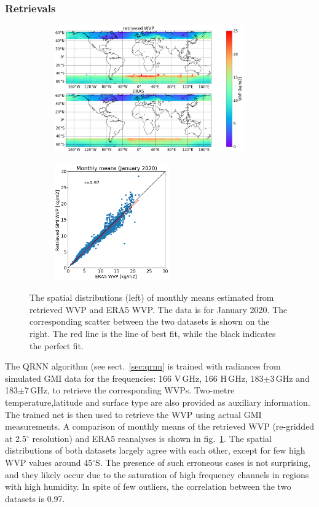 \documentclass[12pt,oneside,a4paper]{article}
\begin{document}
\subsubsection{Retrievals}
\label{sec:preliminary_results}
\begin{figure}[t]
	\centering
	\begin{subfigure}{.54\textwidth}
		\includegraphics[height = 55mm]{Figures/WVP_spatial_jan2020.png}
	\end{subfigure}
	\begin{subfigure}{.34\textwidth}
	\includegraphics[height = 50mm]{Figures/WVP_scatter_monthlymean.png} 
	\end{subfigure}
	\caption{The spatial distributions (left) of monthly means estimated from retrieved WVP and ERA5 WVP. The data is for January 2020. The corresponding scatter between the two datasets is shown on the right. The red line is the line of best fit, while the black indicates the perfect fit.}
	\label{fig:WVP_retrievals}
\end{figure}

The QRNN algorithm (see sect.~\ref{sec:qrnn} is trained with radiances from simulated GMI data for the frequencies: 166 V\,GHz, 166 H\,GHz, 183$\pm$3\,GHz and 183$\pm$7\,GHz, to retrieve the corresponding WVPs. Two-metre temperature,latitude and surface type are also provided as auxiliary information. The trained net is then used to retrieve the WVP using actual GMI measurements. A comparison of monthly means of the  retrieved WVP (re-gridded at 2.5$^{\circ}$ resolution) and ERA5 reanalyses is shown in fig.~\ref{fig:WVP_retrievals}. The spatial distributions of both datasets largely agree with each other, except for few high WVP values around 45$^{\circ}$S. The presence of such erroneous cases is not surprising, and they likely occur due to the saturation of high frequency channels in regions with high humidity. In spite of few outliers, the correlation between the two datasets is 0.97.
\end{document}
